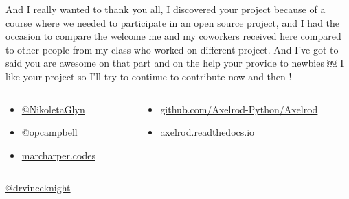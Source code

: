 \documentclass{beamer}
\begin{document}
\begin{frame}
    \begin{footnotesize}
        \begin{tcolorbox}[colback=github,colframe=blue!40!black,title=
                Julie Rymer - \href{https://gitter.im/Axelrod-Python/Axelrod?at=591388592b926f8a6741435d}
                {@Chadys} - (10 May 2017):
    ]
                And I really wanted to thank you all, I discovered your project because of a
                course where we needed to participate in an open source project, and I had the
                occasion to compare the welcome me and my coworkers received here compared to
                other people from my class who worked on different project. And I've got to said
                you are awesome on that part and on the help your provide to newbies ￼ I like
                your project so I'll try to continue to contribute now and then !
       \end{tcolorbox}
    \end{footnotesize}

   \begin{columns}
        \begin{column}{.35\textwidth}
            \begin{itemize}
                \item \href{https://twitter.com/NikoletaGlyn}{@NikoletaGlyn}
                \item \href{https://twitter.com/opcampbell}{@opcampbell}
                \item \href{http://marcharper.codes/}{marcharper.codes}
            \end{itemize}
        \end{column}
        \begin{column}{.65\textwidth}
            \begin{itemize}
                \item \href{https://github.com/Axelrod-Python/Axelrod}{github.com/Axelrod-Python/Axelrod}
                \item \href{https://axelrod.readthedocs.io/en/stable/}{axelrod.readthedocs.io}
            \end{itemize}
        \end{column}
   \end{columns}

        \begin{center}
               \href{https://twitter.com/drvinceknight}{@drvinceknight}
        \end{center}


\end{frame}
\end{document}
